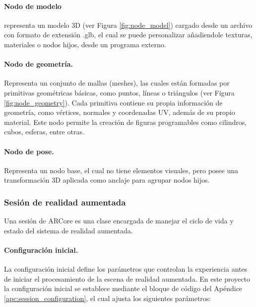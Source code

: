             

            \paragraph{Nodo de modelo}representa un modelo 3D (ver Figura \ref{fig:node_model}) cargado desde un archivo con formato de extensión .glb, el cual se puede personalizar añadiendole texturas, materiales o nodos hijos, desde un programa externo.

            

            \paragraph{Nodo de geometría.}Representa un conjunto de mallas (meshes), las cuales están formadas por primitivas geométricas básicas, como puntos, líneas o triángulos (ver Figura \ref{fig:node_geometry}). Cada primitiva contiene su propia información de geometría, como vértices, normales y coordenadas UV, además de su propio material. Este nodo permite la creación de figuras programables como cilindros, cubos, esferas, entre otras.

                        

            \paragraph{Nodo de pose.}Representa un nodo base, el cual no tiene elementos visuales, pero posee una transformación 3D aplicada como anclaje para agrupar nodos hijos.

        \subsubsection{Sesión de realidad aumentada}

            Una sesión de ARCore es una clase encargada de manejar el ciclo de vida y estado del sistema de realidad aumentada.
            
            \paragraph{Configuración inicial.}La configuración inicial define los parámetros que controlan la experiencia antes de iniciar el procesamiento de la escena de realidad aumentada. En este proyecto la configuración inicial se establece mediante el bloque de código del Apéndice \ref{apc:session_configuration}, el cual ajusta los siguientes parámetros:

